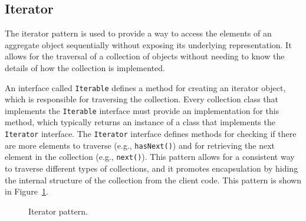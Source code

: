 \subsection{Iterator}

The iterator pattern is used to provide a way to access the elements of an aggregate object sequentially without exposing its underlying representation. It allows for the traversal of a collection of objects without needing to know the details of how the collection is implemented.

An interface called \texttt{Iterable} defines a method for creating an iterator object, which is responsible for traversing the collection. Every collection class that implements the \texttt{Iterable} interface must provide an implementation for this method, which typically returns an instance of a class that implements the \texttt{Iterator} interface. The \texttt{Iterator} interface defines methods for checking if there are more elements to traverse (e.g., \texttt{hasNext()}) and for retrieving the next element in the collection (e.g., \texttt{next()}). This pattern allows for a consistent way to traverse different types of collections, and it promotes encapsulation by hiding the internal structure of the collection from the client code. This pattern is shown in Figure~\ref{fig:iterator}.
\begin{figure}
    \centering
    \caption{Iterator pattern.}
    \label{fig:iterator}
\end{figure}

